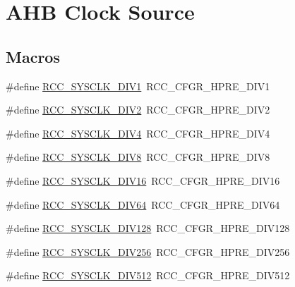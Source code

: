 \hypertarget{group___r_c_c___a_h_b___clock___source}{}\section{A\+HB Clock Source}
\label{group___r_c_c___a_h_b___clock___source}
\subsection*{Macros}
\begin{DoxyCompactItemize}
\item 
\#define \hyperlink{group___r_c_c___a_h_b___clock___source_ga226f5bf675015ea677868132b6b83494}{R\+C\+C\+\_\+\+S\+Y\+S\+C\+L\+K\+\_\+\+D\+I\+V1}~R\+C\+C\+\_\+\+C\+F\+G\+R\+\_\+\+H\+P\+R\+E\+\_\+\+D\+I\+V1
\item 
\#define \hyperlink{group___r_c_c___a_h_b___clock___source_gac37c0610458a92e3cb32ec81014625c3}{R\+C\+C\+\_\+\+S\+Y\+S\+C\+L\+K\+\_\+\+D\+I\+V2}~R\+C\+C\+\_\+\+C\+F\+G\+R\+\_\+\+H\+P\+R\+E\+\_\+\+D\+I\+V2
\item 
\#define \hyperlink{group___r_c_c___a_h_b___clock___source_ga6fd3652d6853563cdf388a4386b9d22f}{R\+C\+C\+\_\+\+S\+Y\+S\+C\+L\+K\+\_\+\+D\+I\+V4}~R\+C\+C\+\_\+\+C\+F\+G\+R\+\_\+\+H\+P\+R\+E\+\_\+\+D\+I\+V4
\item 
\#define \hyperlink{group___r_c_c___a_h_b___clock___source_ga7def31373854ba9c72bb76b1d13e3aad}{R\+C\+C\+\_\+\+S\+Y\+S\+C\+L\+K\+\_\+\+D\+I\+V8}~R\+C\+C\+\_\+\+C\+F\+G\+R\+\_\+\+H\+P\+R\+E\+\_\+\+D\+I\+V8
\item 
\#define \hyperlink{group___r_c_c___a_h_b___clock___source_ga895462b261e03eade3d0139cc1327a51}{R\+C\+C\+\_\+\+S\+Y\+S\+C\+L\+K\+\_\+\+D\+I\+V16}~R\+C\+C\+\_\+\+C\+F\+G\+R\+\_\+\+H\+P\+R\+E\+\_\+\+D\+I\+V16
\item 
\#define \hyperlink{group___r_c_c___a_h_b___clock___source_ga73814b5a7ee000687ec8334637ca5b14}{R\+C\+C\+\_\+\+S\+Y\+S\+C\+L\+K\+\_\+\+D\+I\+V64}~R\+C\+C\+\_\+\+C\+F\+G\+R\+\_\+\+H\+P\+R\+E\+\_\+\+D\+I\+V64
\item 
\#define \hyperlink{group___r_c_c___a_h_b___clock___source_ga43eddf4d4160df30548a714dce102ad8}{R\+C\+C\+\_\+\+S\+Y\+S\+C\+L\+K\+\_\+\+D\+I\+V128}~R\+C\+C\+\_\+\+C\+F\+G\+R\+\_\+\+H\+P\+R\+E\+\_\+\+D\+I\+V128
\item 
\#define \hyperlink{group___r_c_c___a_h_b___clock___source_ga94956d6e9c3a78230bf660b838f987e2}{R\+C\+C\+\_\+\+S\+Y\+S\+C\+L\+K\+\_\+\+D\+I\+V256}~R\+C\+C\+\_\+\+C\+F\+G\+R\+\_\+\+H\+P\+R\+E\+\_\+\+D\+I\+V256
\item 
\#define \hyperlink{group___r_c_c___a_h_b___clock___source_gabe18a9d55c0858bbfe3db657fb64c76d}{R\+C\+C\+\_\+\+S\+Y\+S\+C\+L\+K\+\_\+\+D\+I\+V512}~R\+C\+C\+\_\+\+C\+F\+G\+R\+\_\+\+H\+P\+R\+E\+\_\+\+D\+I\+V512
\end{DoxyCompactItemize}



